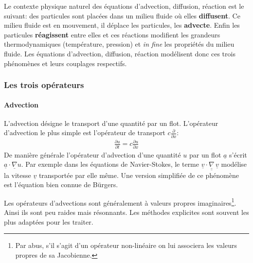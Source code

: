 Le contexte physique naturel des équations d'advection, diffusion, réaction est le suivant:
des particules sont placées dans un milieu fluide où elles \textbf{diffusent}. Ce milieu fluide
est en mouvement, il déplace les particules, les \textbf{advecte}.
Enfin les particules \textbf{réagissent} entre elles et ces réactions modifient les grandeurs thermodynamiques (température, pression) et \textit{in fine} les propriétés
du milieu fluide.
Les équations d'advection, diffusion, réaction modélisent donc ces trois phénomènes et leurs couplages respectifs.

\subsubsection{Les trois opérateurs}
\paragraph{Advection}
    L'advection désigne le transport d'une quantité par un flot. L'opérateur d'advection le plus simple est l'opérateur
    de transport $c \frac{\partial}{\partial x}$:
    \begin{align}\frac{\partial u}{\partial t} = c \frac{\partial u}{\partial x}\end{align}
    De manière générale l'opérateur d’advection d'une quantité $u$ par un flot $\underline a$ s'écrit $\underline a \cdot \underline{\nabla} u$.
    Par exemple dans les équations de Navier-Stokes, le terme $\underline{v} \cdot \underline{\underline \nabla} \, \underline{v}$ modélise 
    la vitesse $\underline v$ transportée par elle même. Une version simplifiée de ce phénomène est l'équation bien connue de Bürgers.\par 
    Les opérateurs d'advections sont généralement à valeurs propres imaginaires\footnote{Par abus, s'il s'agit d'un opérateur non-linéaire on lui associera les valeurs propres de sa Jacobienne.}.
    Ainsi ils sont peu raides mais résonnants. Les méthodes explicites sont souvent les plus adaptées pour les traiter.

